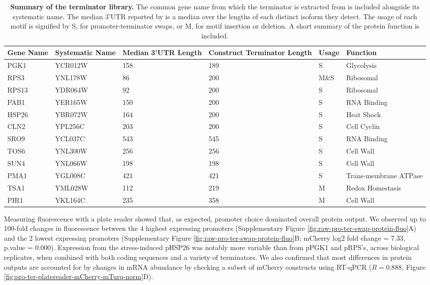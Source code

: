\documentclass[../main.tex]{subfiles}
\begin{document}
\begin{table}
    \def\arraystretch{1.25}
    \setlength{\tabcolsep}{5pt}
\centering
\fontsize{9}{9}\selectfont
\begin{tabular}{
  | m{4em} | m{5em} | m{5em} | m{5em} | m{3em} | m{6em} | }
\hline
\textbf{Gene Name} & \textbf{Systematic Name} & \textbf{Median 3’UTR Length} & \textbf{Construct Terminator Length} & \textbf{Usage}&  \textbf{Function}\\
\hline
PGK1 & YCR012W & 158 & 189 & S & Glycolysis\\
\hline
RPS3 & YNL178W & 86 & 200 & M\&S & Ribosomal\\
\hline
RPS13 & YDR064W & 92 & 200 & S & Ribosomal\\
\hline
PAB1 & YER165W & 150 & 200 & S & RNA Binding\\
\hline
HSP26 & YBR072W & 164 & 200 & S & Heat Shock\\
\hline
CLN2 & YPL256C & 203 & 200 & S & Cell Cyclin\\
\hline
SRO9 & YCL037C & 543 & 545 & S & RNA Binding\\
\hline
TOS6 & YNL300W & 256 & 256 & S & Cell Wall\\
\hline
SUN4 & YNL066W & 198 & 198 & S & Cell Wall\\
\hline
PMA1 & YGL008C & 421 & 421 & S & Trans-membrane ATPase\\
\hline
TSA1 & YML028W & 112 & 219 & M & Redox Homestasis\\
\hline
PIR1 & YKL164C & 235 & 358 & M & Cell Wall\\
\hline
\end{tabular}
\caption[Summary of the terminator library.]{\label{tab:terminator-summary-table}\textbf{Summary of the terminator library.} The common gene name from which the terminator is extracted from is included alongside its systematic name. The median 3'UTR reported by \parencite{Pelechano2013} is a median over the lengths of each distinct isoform they detect. The usage of each motif is signified by S, for promoter-terminator swaps, or M, for motif insertion or deletion. A short summary of the protein function is included.}
\end{table}

Measuring fluorescence with a plate reader showed that, as expected, promoter choice dominated overall protein output.
We observed up to 100-fold changes in fluorescence between the 4 highest expressing promoters (Supplementary Figure \ref{fig:raw-pro-ter-swap-protein-fluo}A) and the 2 lowest expressing promoters (Supplementary Figure \ref{fig:raw-pro-ter-swap-protein-fluo}B; mCherry log2 fold change = 7.33, p.value = 0.000).
Expression from the stress-induced pHSP26 was notably more variable than from pPGK1 and pRPS's, across biological replicates, when combined with both coding sequences and a variety of terminators.
We also confirmed that most differences in protein outputs are accounted for by changes in mRNA abundance by checking a subset of mCherry constructs using RT-qPCR (\(R = 0.888\), Figure \ref{fig:pro-ter-platereader-mCherry-mTurq-norm}D).
\end{document}
